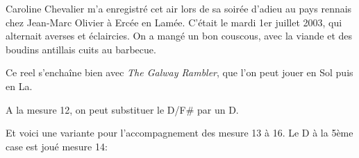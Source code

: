 Caroline Chevalier m'a enregistré cet air lors de sa soirée d'adieu au pays
rennais chez Jean-Marc Olivier à Ercée en Lamée. C'était le mardi 1er juillet
2003, qui alternait averses et éclaircies. On a mangé un bon couscous, avec la
viande et des boudins antillais cuits au barbecue.

Ce reel s'enchaîne bien avec \emph{The Galway Rambler}, que l'on peut jouer en Sol puis
en La.

\chords{
  \GMaj
  \Amin
  \DinG
  \CMaj
  \Emin
  \DbFs
}

\tune

A la mesure 12, on peut substituer le D/F\# par un D. 

Et voici une variante pour l'accompagnement des mesure 13 à 16. Le D à la 5ème
case est joué mesure 14:

